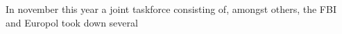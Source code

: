 In november this year a joint taskforce consisting of, amongst others, the FBI and Europol took down several
~\cite{wired_tor_bust}~\cite{euro_tor_bust}



